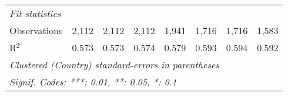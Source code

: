 \begin{tabular}{lccccccc}
   \midrule \emph{Fit statistics}\\
   Observations                                                                          & 2,112   & 2,112   & 2,112   & 1,941       & 1,716         & 1,716        & 1,583\\  
   R$^2$                                                                                 & 0.573   & 0.573   & 0.574   & 0.579       & 0.593         & 0.594        & 0.592\\  
   \midrule
   \multicolumn{8}{l}{\emph{Clustered (Country) standard-errors in parentheses}}\\
   \multicolumn{8}{l}{\emph{Signif. Codes: ***: 0.01, **: 0.05, *: 0.1}}\\
\end{tabular}
\par\endgroup


